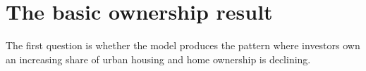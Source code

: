 
%







\section{The basic ownership result}









The first question is whether the model produces the pattern %
where investors own an increasing share of urban housing and home ownership is declining. %

